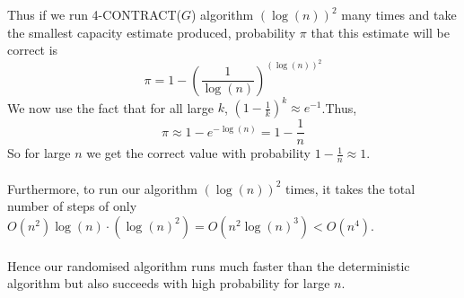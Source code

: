 \documentclass[12pt, letterpaper]{article}
\begin{document}
Thus if we run 4-CONTRACT($G$) algorithm $(\log(n))^2$ many times and take the smallest capacity estimate produced, probability $\pi$ that this estimate will be correct is \[\pi = 1 - (\frac{1}{\log(n)})^{(\log(n))^2}\] We now use the fact that for all large $k$, $(1- \frac{1}{k})^k \approx e^{-1}$.Thus,\[\pi \approx 1 - e^{-\log(n)} = 1 - \frac{1}{n}\]So for large $n$ we get the correct value with probability $1 - \frac{1}{n} \approx 1$.\\\\
Furthermore, to run our algorithm $(\log(n))^2$ times, it takes the total number of steps of only $O(n^2)\log(n) \cdot (\log(n)^2) = O(n^2\log(n)^3) < O(n^4)$.\\\\
Hence our randomised algorithm runs much faster than the deterministic algorithm but also succeeds with high probability for large $n$.
\end{document}
